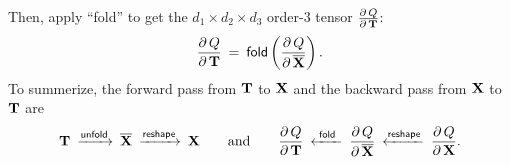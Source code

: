 \documentclass[11pt]{article}
\numberwithin{equation}{section}
\def\T{{\bf T}}
\def\X{{\bf X}}
\begin{document}
Then, apply ``\textsf{fold}'' to get the $d_1\times d_2 \times d_3$ order-3 tensor  $\frac{\partial \, Q}{\partial \, \T}$:
\begin{equation*}
    \frac{\partial \, Q}{\partial \, \T}
    \: = \: \textsf{fold} \left( \frac{\partial \, Q}{\partial \, \overline{\X}}   \right).
\end{equation*}
To summerize, the forward pass from $\T$ to $\X$ and the backward pass from $\X$ to $\T$ are
\begin{equation*}
    \T \: \xrightarrow{\textsf{unfold}} \: \overline{\X} \: \xrightarrow{\textsf{reshape}}  \: \X
    \qquad \textrm{and} \qquad
    \frac{\partial \, Q}{\partial \, \T} 
    \: \xleftarrow{\textsf{~fold~}} \: 
    \frac{\partial \, Q}{\partial \, \overline{\X}} 
    \: \xleftarrow{\textsf{reshape}}  \: 
    \frac{\partial \, Q}{\partial \, \X} .
\end{equation*}
\end{document}
